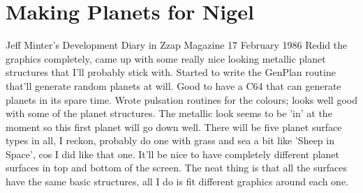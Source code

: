 \chapter{Making Planets for Nigel} 
\renewcommand*{\thesubfigure}{(\arabic{subfigure})}

\begin{q}{Jeff Minter's Development Diary in Zzap Magazine\cite{planner}}
17 February 1986 
Redid the graphics completely, came up with some really
nice looking metallic planet structures that I'll probably stick with. Started
to write the GenPlan routine that'll generate random planets at will. Good to
have a C64 that can generate planets in its spare time. Wrote pulsation
routines for the colours; looks well good with some of the planet structures.
The metallic look seems to be 'in' at the moment so this first planet will go
down well. There will be five planet surface types in all, I reckon, probably
do one with grass and sea a bit like 'Sheep in Space', cos I did like that one.
It'll be nice to have completely different planet surfaces in top and bottom of
the screen. The neat thing is that all the surfaces have the same basic
structures, all I do is fit different graphics around each one. 
\end{q}

\clearpage


























